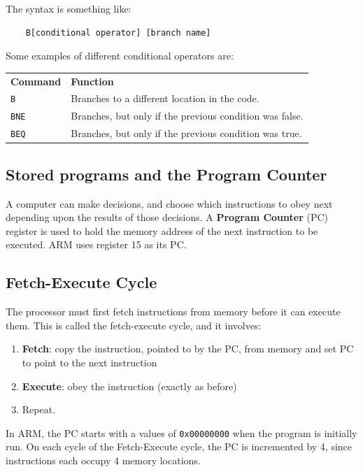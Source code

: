 \documentclass{article}
\begin{document}
The syntax is something like:

\begin{verbatim}
	B[conditional operator]	[branch name]
\end{verbatim}

Some examples of different conditional operators are:

\begin{tabularx}{\textwidth}{l X}
	{\bf Command} & {\bf Function}\\
	\texttt{B} & Branches to a different location in the code.\\
	\texttt{BNE} & Branches, but only if the previous condition was false.\\
	\texttt{BEQ} & Branches, but only if the previous condition was true.\\
\end{tabularx}

\subsection{Stored programs and the Program Counter}
\label{subsec:pc}

A computer can make decisions, and choose which instructions to obey next depending upon the results of those decisions. A {\bf Program Counter} (PC) register is used to hold the memory address of the next instruction to be executed. ARM uses register 15 as its PC.

\subsection{Fetch-Execute Cycle}

The processor must first fetch instructions from memory before it can execute them. This is called the fetch-execute cycle, and it involves:

\begin{enumerate}
	\item \textbf{Fetch}: copy the instruction, pointed to by the PC, from memory and set PC to point to the next instruction
	\item \textbf{Execute}:  obey the instruction (exactly as before)
	\item Repeat.
\end{enumerate}

In ARM, the PC starts with a values of \texttt{0x00000000} when the program is initially run. On each cycle of the Fetch-Execute cycle, the PC is incremented by 4, since instructions each occupy 4 memory locations.
\end{document}
